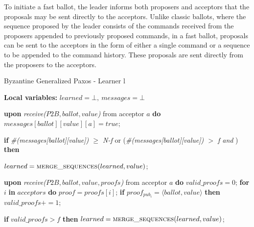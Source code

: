 To initiate a fast ballot, the leader informs both proposers and acceptors that the proposals may be sent directly to the acceptors. Unlike classic ballots, where the sequence proposed by the leader consists of the commands received from the proposers appended to previously proposed commands, in a fast ballot, proposals can be sent to the acceptors in the form of either a single command or a sequence to be appended to the command history. These proposals are sent directly from the proposers to the acceptors.\par
\vspace*{-.4cm}
\begin{algorithm}
	\caption{Byzantine Generalized Paxos - Learner l}
	\label{BFT-Learn}
	\textbf{Local variables:} $learned = \bot,\ messages = \bot$ 
	\vspace*{-.5cm}
	\begin{multicols}{2}
		\begin{algorithmic}[1]
			\State \textbf{upon} \textit{receive($P2B, ballot, value$)} from acceptor $a$ \textbf{do}
			\State \hspace{\algorithmicindent} $messages[ballot][value][a] = true$;
			\State \hspace{\algorithmicindent} \parbox{\linewidth}{\textbf{if} \textit{\#(messages[ballot][value]) $\geq$ N-f} or (\textit{\#(messages[ballot][value]) $>$ f and }) \textbf{then}}
			\State \hspace{\algorithmicindent}\hspace{\algorithmicindent} $learned = \Call{merge\_sequences}{learned, value}$;
			
			\State
			\State \textbf{upon} \textit{receive($P2B, ballot, value, proofs$)} from acceptor $a$ \textbf{do}
			\State \hspace{\algorithmicindent} $valid\_proofs = 0$;
			\State \hspace{\algorithmicindent} \textbf{for} $i$ \textbf{in} $acceptors$ \textbf{do}
			\State \hspace{\algorithmicindent}\hspace{\algorithmicindent} $proof = proofs[i]$;
			\State \hspace{\algorithmicindent}\hspace{\algorithmicindent} \textbf{if} $proof_{pub_i} = \langle ballot, value \rangle$ \textbf{then}
			\State \hspace{\algorithmicindent}\hspace{\algorithmicindent}\hspace{\algorithmicindent} 
			$valid\_proofs \mathrel{+{=}} 1$;

			\State \hspace{\algorithmicindent} \textbf{if} $valid\_proofs > f$ \textbf{then}
			\State \hspace{\algorithmicindent}\hspace{\algorithmicindent} $learned = \Call{merge\_sequences}{learned, value}$;
		\end{algorithmic}
	\end{multicols}
	\vspace*{-.4cm}
\end{algorithm}
